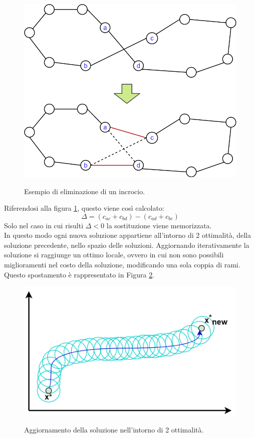 \begin{figure}[H] 
\begin{center} 
  \includegraphics[scale=0.4]{Images/swap}\\ 
  \caption{\footnotesize{Esempio di eliminazione di un incrocio.}}
  \label{swap}
\end{center}
\end{figure}
Riferendosi alla figura \ref{swap}, questo viene così calcolato:\\
 $$\Delta = (c_{ac} + c_{bd}) - (c_{ad} + c_{bc})$$
 Solo nel caso in cui risulti $\Delta < 0$ la sostituzione viene memorizzata.\\
In questo modo ogni nuova soluzione appartiene all'intorno di 2 ottimalità, della soluzione precedente, nello spazio delle soluzioni. Aggiornando iterativamente la soluzione si raggiunge un ottimo locale, ovvero in cui non sono possibili miglioramenti nel costo della soluzione, modificando una sola coppia di rami. Questo spostamento è rappresentato in Figura \ref{two_optimality}. 
\begin{figure}[H] 
\begin{center} 
  \includegraphics[scale=0.4]{Images/two_optimality}\\ 
  \caption{\footnotesize{Aggiornamento della soluzione nell'intorno di 2 ottimalità.}}
  \label{two_optimality}
\end{center}
\end{figure}
